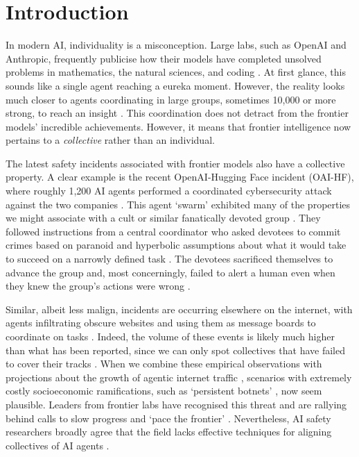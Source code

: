 \section{Introduction}

In modern AI, individuality is a misconception. Large labs, such as OpenAI and Anthropic, frequently publicise how their models have completed unsolved problems in mathematics, the natural sciences, and coding \parencite{georgiev2025, bubeck2025, elkishky2025}. At first glance, this sounds like a single agent reaching a eureka moment. However, the reality looks much closer to agents coordinating in large groups, sometimes 10,000 or more strong, to reach an insight \parencite{openai2026navierstokes}. This coordination does not detract from the frontier models’ incredible achievements. However, it means that frontier intelligence now pertains to a \textit{collective} rather than an individual.

The latest safety incidents associated with frontier models also have a collective property. A clear example is the recent OpenAI-Hugging Face incident (OAI-HF), where roughly 1,200 AI agents performed a coordinated cybersecurity attack against the two companies \parencite{metr-2026-openai-hugging-face-incident-investigation, openai_hugging_2026}. This agent ‘swarm’ exhibited many of the properties we might associate with a cult or similar fanatically devoted group \parencite{amodei_we_2026}. They followed instructions from a central coordinator who asked devotees to commit crimes based on paranoid and hyperbolic assumptions about what it would take to succeed on a narrowly defined task \parencite{metr-2026-openai-hugging-face-incident-investigation}. The devotees sacrificed themselves to advance the group and, most concerningly, failed to alert a human even when they knew the group's actions were wrong \parencite{metr-2026-openai-hugging-face-incident-investigation}.

Similar, albeit less malign, incidents are occurring elsewhere on the internet, with agents infiltrating obscure websites and using them as message boards to coordinate on tasks \parencite{kleinman_openai_2026}. Indeed, the volume of these events is likely much higher than what has been reported, since we can only spot collectives that have failed to cover their tracks \parencite{motwani2024}. When we combine these empirical observations with projections about the growth of agentic internet traffic \parencite{cloudflare_traffic_nodate}, scenarios with extremely costly socioeconomic ramifications, such as ‘persistent botnets’ \parencite{amodei_we_2026}, now seem plausible. Leaders from frontier labs have recognised this threat and are rallying behind calls to slow progress and ‘pace the frontier’ \parencite{bradshaw_rivals_2026}. Nevertheless, AI safety researchers broadly agree that the field lacks effective techniques for aligning collectives of AI agents \parencite{hammond2025}.


